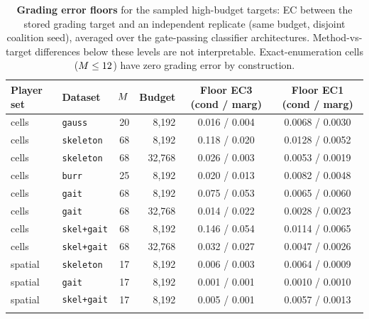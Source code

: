 \begin{table}[t]
\centering
\caption{\textbf{Grading error floors} for the sampled high-budget targets: EC between the stored grading target and an independent replicate (same budget, disjoint coalition seed), averaged over the gate-passing classifier architectures. Method-vs-target differences below these levels are not interpretable. Exact-enumeration cells ($M \leq 12$) have zero grading error by construction.}
\label{tab:app-floors}
\footnotesize
\begin{tabular}{llrrcc}
\toprule
Player set & Dataset & $M$ & Budget & Floor EC3 (cond / marg) & Floor EC1 (cond / marg) \\
\midrule
cells & \texttt{gauss} & 20 & 8,192 & 0.016 / 0.004 & 0.0068 / 0.0030 \\
cells & \texttt{skeleton} & 68 & 8,192 & 0.118 / 0.020 & 0.0128 / 0.0052 \\
cells & \texttt{skeleton} & 68 & 32,768 & 0.026 / 0.003 & 0.0053 / 0.0019 \\
cells & \texttt{burr} & 25 & 8,192 & 0.020 / 0.013 & 0.0082 / 0.0048 \\
cells & \texttt{gait} & 68 & 8,192 & 0.075 / 0.053 & 0.0065 / 0.0060 \\
cells & \texttt{gait} & 68 & 32,768 & 0.014 / 0.022 & 0.0028 / 0.0023 \\
cells & \texttt{skel+gait} & 68 & 8,192 & 0.146 / 0.054 & 0.0114 / 0.0065 \\
cells & \texttt{skel+gait} & 68 & 32,768 & 0.032 / 0.027 & 0.0047 / 0.0026 \\
spatial & \texttt{skeleton} & 17 & 8,192 & 0.006 / 0.003 & 0.0064 / 0.0009 \\
spatial & \texttt{gait} & 17 & 8,192 & 0.001 / 0.001 & 0.0010 / 0.0010 \\
spatial & \texttt{skel+gait} & 17 & 8,192 & 0.005 / 0.001 & 0.0057 / 0.0013 \\
\addlinespace
\multicolumn{6}{l}{Cross-budget agreement at $\np{=}68$ (cond target, $B{=}8{,}192$ vs $B{=}32{,}768$): EC3 0.065} \\
\bottomrule
\end{tabular}
\end{table}
